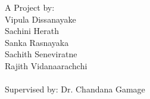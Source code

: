 
%
%
%

\begin{dedication}
A Project by:\\
Vipula  Dissanayake\\
Sachini  Herath\\
Sanka Rasnayaka\\
Sachith Seneviratne\\
Rajith Vidanaarachchi\\
\\
Supervised by: Dr. Chandana Gamage\\
\end{dedication}




